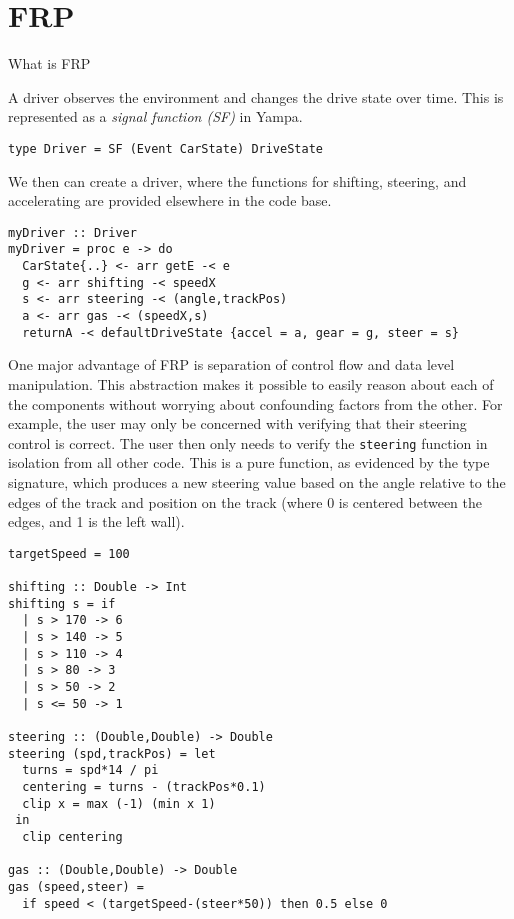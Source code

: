 \section{FRP}

What is FRP

A driver observes the environment and changes the drive state over time.
This is represented as a \textit{signal function (SF)} in Yampa.

\begin{lstlisting}
type Driver = SF (Event CarState) DriveState
\end{lstlisting}

We then can create a driver, where the functions for shifting, steering, and accelerating are provided elsewhere in the code base.

\begin{lstlisting}
myDriver :: Driver
myDriver = proc e -> do
  CarState{..} <- arr getE -< e
  g <- arr shifting -< speedX
  s <- arr steering -< (angle,trackPos)
  a <- arr gas -< (speedX,s)
  returnA -< defaultDriveState {accel = a, gear = g, steer = s}
\end{lstlisting}

One major advantage of FRP is separation of control flow and data level manipulation. 
This abstraction makes it possible to easily reason about each of the components without worrying about confounding factors from the other.
For example, the user may only be concerned with verifying that their steering control is correct.
The user then only needs to verify the \texttt{steering} function in isolation from all other code.
This is a pure function, as evidenced by the type signature, which produces a new steering value based on the angle relative to the edges of the track and position on the track (where 0 is centered between the edges, and 1 is the left wall).

\begin{lstlisting}
targetSpeed = 100

shifting :: Double -> Int
shifting s = if 
  | s > 170 -> 6
  | s > 140 -> 5
  | s > 110 -> 4
  | s > 80 -> 3
  | s > 50 -> 2
  | s <= 50 -> 1
 
steering :: (Double,Double) -> Double
steering (spd,trackPos) = let
  turns = spd*14 / pi
  centering = turns - (trackPos*0.1)
  clip x = max (-1) (min x 1)
 in
  clip centering
  
gas :: (Double,Double) -> Double
gas (speed,steer) = 
  if speed < (targetSpeed-(steer*50)) then 0.5 else 0
\end{lstlisting}

